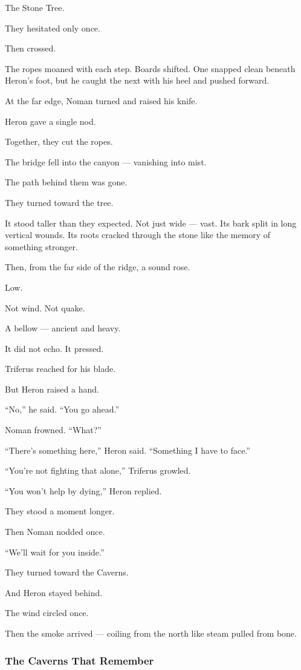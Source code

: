 \documentclass[12pt]{article}
\begin{document}
The Stone Tree.

They hesitated only once.

Then crossed.

The ropes moaned with each step. Boards shifted. One snapped clean beneath Heron’s foot, but he caught the next with his heel and pushed forward.

At the far edge, Noman turned and raised his knife.

Heron gave a single nod.

Together, they cut the ropes.

The bridge fell into the canyon — vanishing into mist.

The path behind them was gone.

\bigskip

They turned toward the tree.

It stood taller than they expected. Not just wide — vast. Its bark split in long vertical wounds. Its roots cracked through the stone like the memory of something stronger.

Then, from the far side of the ridge, a sound rose.

Low.

Not wind. Not quake.

A bellow — ancient and heavy.

It did not echo. It pressed.

Triferus reached for his blade.

But Heron raised a hand.

“No,” he said. “You go ahead.”

Noman frowned. “What?”

“There’s something here,” Heron said. “Something I have to face.”

“You’re not fighting that alone,” Triferus growled.

“You won’t help by dying,” Heron replied.

They stood a moment longer.

Then Noman nodded once.

“We’ll wait for you inside.”

They turned toward the Caverns.

And Heron stayed behind.

The wind circled once.

Then the smoke arrived — coiling from the north like steam pulled from bone.

\dotfill

\subsubsection*{The Caverns That Remember}
\end{document}

